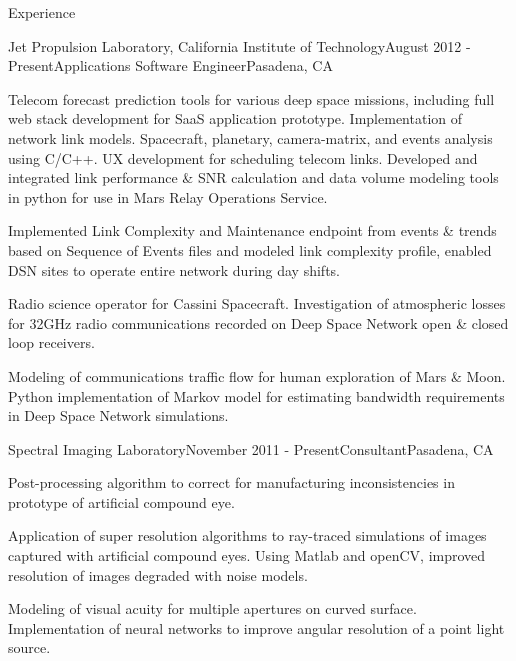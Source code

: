 \documentclass{resume} %
\begin{document}
\begin{rSection}{Experience}
\begin{rSubsection}{Jet Propulsion Laboratory, California Institute of Technology}{August 2012 - Present}{Applications Software Engineer}{Pasadena, CA}
\item Telecom forecast prediction tools for various deep space missions, including full web stack development for SaaS application prototype. Implementation of network link models. Spacecraft, planetary, camera-matrix, and events analysis using C/C++. UX development for scheduling telecom links. Developed and integrated link performance \& SNR calculation and data volume modeling tools in python for use in Mars Relay Operations Service.

\item Implemented Link Complexity and Maintenance endpoint from events \& trends based on Sequence of Events files and modeled link complexity profile, enabled DSN sites to operate entire network during day shifts. 

\item Radio science operator for Cassini Spacecraft. Investigation of atmospheric losses for 32GHz radio communications recorded on Deep Space Network open \& closed loop receivers. 

\item Modeling of communications traffic flow for human exploration of Mars \& Moon. Python implementation of Markov model for estimating bandwidth requirements in Deep Space Network simulations.

\end{rSubsection}


\begin{rSubsection}{Spectral Imaging Laboratory}{November 2011 - Present}{Consultant}{Pasadena, CA}
\item Post-processing algorithm to correct for manufacturing inconsistencies in prototype of artificial compound eye.
\item Application of super resolution algorithms to ray-traced simulations of images captured with artificial compound eyes. Using Matlab and openCV, improved resolution of images degraded with noise models.
\item Modeling of visual acuity for multiple apertures on curved surface. Implementation of neural networks to improve angular resolution of a point light source. 
\end{rSubsection}





\end{rSection}
\end{document}
